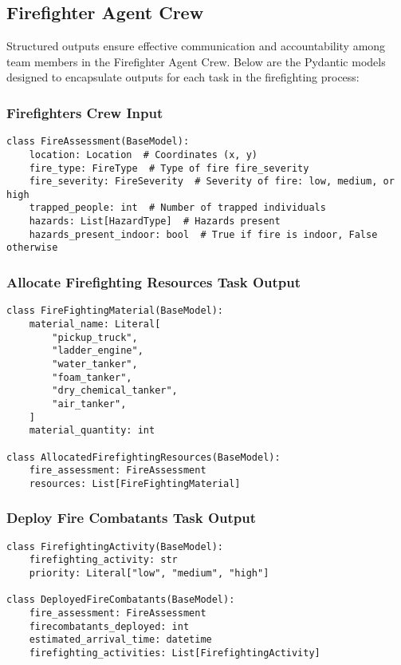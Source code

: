 \subsection{Firefighter Agent Crew}

Structured outputs ensure effective communication and accountability among team members in the Firefighter Agent Crew. Below are the Pydantic models designed to encapsulate outputs for each task in the firefighting process:

\subsubsection{Firefighters Crew Input}
\begin{lstlisting}[caption={Pydantic model for Firefighters Crew Input}]
class FireAssessment(BaseModel):
    location: Location  # Coordinates (x, y)
    fire_type: FireType  # Type of fire fire_severity
    fire_severity: FireSeverity  # Severity of fire: low, medium, or high
    trapped_people: int  # Number of trapped individuals
    hazards: List[HazardType]  # Hazards present
    hazards_present_indoor: bool  # True if fire is indoor, False otherwise
\end{lstlisting}


\subsubsection{Allocate Firefighting Resources Task Output}
\begin{lstlisting}[caption={Pydantic model for Allocate Firefighting Resources Task Output}]
class FireFightingMaterial(BaseModel):
    material_name: Literal[
        "pickup_truck",
        "ladder_engine",
        "water_tanker",
        "foam_tanker",
        "dry_chemical_tanker",
        "air_tanker",
    ]
    material_quantity: int

class AllocatedFirefightingResources(BaseModel):
    fire_assessment: FireAssessment
    resources: List[FireFightingMaterial]
\end{lstlisting}


\subsubsection{Deploy Fire Combatants Task Output}
\begin{lstlisting}[caption={Pydantic model for Deploy Fire Combatants Task Output}]
class FirefightingActivity(BaseModel):
    firefighting_activity: str
    priority: Literal["low", "medium", "high"]

class DeployedFireCombatants(BaseModel):
    fire_assessment: FireAssessment
    firecombatants_deployed: int
    estimated_arrival_time: datetime
    firefighting_activities: List[FirefightingActivity]
\end{lstlisting}


